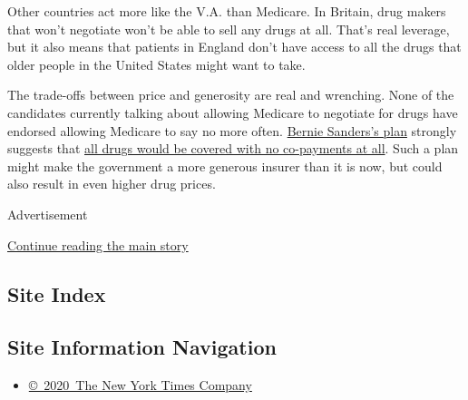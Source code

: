 Other countries act more like the V.A. than Medicare. In Britain, drug
makers that won't negotiate won't be able to sell any drugs at all.
That's real leverage, but it also means that patients in England don't
have access to all the drugs that older people in the United States
might want to take.

The trade-offs between price and generosity are real and wrenching. None
of the candidates currently talking about allowing Medicare to negotiate
for drugs have endorsed allowing Medicare to say no more often.
\href{https://berniesanders.com/issues/medicare-for-all/}{Bernie
Sanders's plan} strongly suggests that
\href{http://www.nytimes.com/2016/01/20/upshot/for-now-bernie-sanderss-health-plan-is-more-of-a-tax-plan.html}{all
drugs would be covered with no co-payments at all}. Such a plan might
make the government a more generous insurer than it is now, but could
also result in even higher drug prices.

Advertisement

\protect\hyperlink{after-bottom}{Continue reading the main story}

\hypertarget{site-index}{%
\subsection{Site Index}\label{site-index}}

\hypertarget{site-information-navigation}{%
\subsection{Site Information
Navigation}\label{site-information-navigation}}

\begin{itemize}
\tightlist
\item
  \href{https://help.nytimes.com/hc/en-us/articles/115014792127-Copyright-notice}{©~2020~The
  New York Times Company}
\end{itemize}

